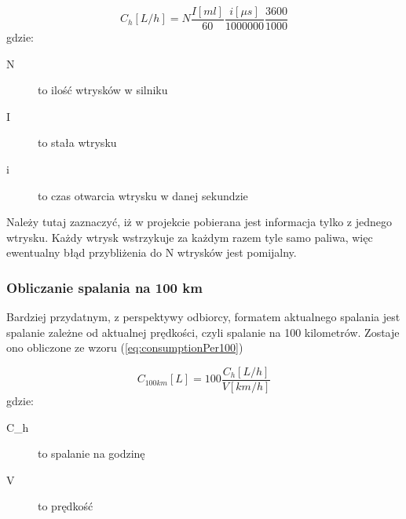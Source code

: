 \begin{equation}\label{eq:consumptionPerHour}
C_{h}[L/h] = N\frac{I[ml]}{60}\frac{i[\mu s]}{1000000}\frac{3600}{1000}
\end{equation}
gdzie:
\begin{description}
\item[N] to ilość wtrysków w silniku
\item[I] to stała wtrysku
\item[i] to czas otwarcia wtrysku w danej sekundzie
\end{description}
\par Należy tutaj zaznaczyć, iż w projekcie pobierana jest informacja tylko z jednego wtrysku. Każdy wtrysk wstrzykuje za każdym razem tyle samo paliwa, więc ewentualny błąd przybliżenia do N wtrysków jest pomijalny.
\subsubsection{Obliczanie spalania na 100 km}
Bardziej przydatnym, z perspektywy odbiorcy, formatem aktualnego spalania jest spalanie zależne od aktualnej prędkości, czyli spalanie na 100 kilometrów. Zostaje ono obliczone ze wzoru (\ref{eq:consumptionPer100})

\begin{equation}\label{eq:consumptionPer100}
C_{100km}[L] = 100\frac{C_{h}[L/h]}{V[km/h]}
\end{equation}
gdzie:
\begin{description}
\item[C_{h}] to spalanie na godzinę
\item[V] to prędkość
\end{description}\\